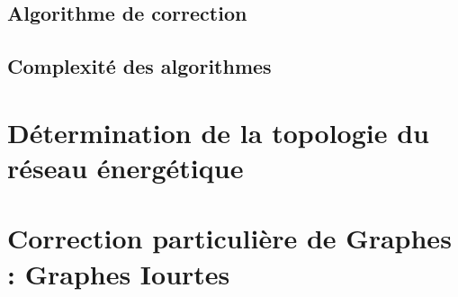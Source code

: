 \documentclass[onecolumn, 12pt]{book}
\begin{document}
	\subsection{Algorithme de correction}
		
	\subsection{Complexit\'e des algorithmes}
		

\section{D\'etermination de la topologie du r\'eseau \'energ\'etique}
	
		
\section{Correction particuli\`ere de Graphes : Graphes Iourtes }
%	 
\end{document}
